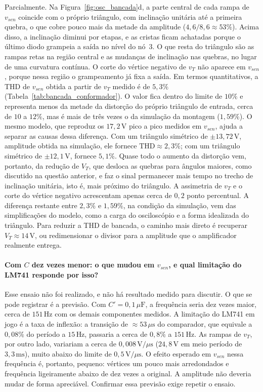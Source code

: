 \documentclass[11pt,a4paper]{article}
\begin{document}
Parcialmente. Na Figura~\ref{fig:osc_bancada}d, a parte central de cada rampa de $v_{sen}$ coincide com o próprio triângulo, com inclinação unitária até a primeira quebra, o que cobre pouco mais da metade da amplitude ($4{,}6/8{,}6 \approx 53\%$). Acima disso, a inclinação diminui por etapas, e as cristas ficam achatadas porque o último diodo grampeia a saída no nível do nó~3. O que resta do triângulo são as rampas retas na região central e as mudanças de inclinação nas quebras, no lugar de uma curvatura contínua. O corte do vértice negativo de $v_T$ não aparece em $v_{sen}$, porque nessa região o grampeamento já fixa a saída. Em termos quantitativos, a THD de $v_{sen}$ obtida a partir de $v_T$ medido é de $5{,}3\%$ (Tabela~\ref{tab:bancada_conformador}). O valor fica dentro do limite de $10\%$ e representa menos da metade da distorção do próprio triângulo de entrada, cerca de $10$ a $12\%$, mas é mais de três vezes o da simulação da montagem ($1{,}59\%$). O mesmo modelo, que reproduz os $17{,}2\,\text{V}$ pico a pico medidos em $v_{sen}$, ajuda a separar as causas dessa diferença. Com um triângulo simétrico de $\pm13{,}72\,\text{V}$, amplitude obtida na simulação, ele fornece $\text{THD} \approx 2{,}3\%$; com um triângulo simétrico de $\pm12{,}1\,\text{V}$, fornece $5{,}1\%$. Quase todo o aumento da distorção vem, portanto, da redução de $V_T$, que desloca as quebras para ângulos maiores, como discutido na questão anterior, e faz o sinal permanecer mais tempo no trecho de inclinação unitária, isto é, mais próximo do triângulo. A assimetria de $v_T$ e o corte do vértice negativo acrescentam apenas cerca de $0{,}2$ ponto percentual. A diferença restante entre $2{,}3\%$ e $1{,}59\%$, na condição da simulação, vem das simplificações do modelo, como a carga do osciloscópio e a forma idealizada do triângulo. Para reduzir a THD de bancada, o caminho mais direto é recuperar $V_T \approx 14\,\text{V}$, ou redimensionar o divisor para a amplitude que o amplificador realmente entrega.

\paragraph{Com $C$ dez vezes menor: o que mudou em $v_{sen}$, e qual limitação do LM741 responde por isso?}

Esse ensaio não foi realizado, e não há resultado medido para discutir. O que se pode registrar é a previsão. Com $C' = 0{,}1\,\mu\text{F}$, a frequência seria dez vezes maior, cerca de $151\,\text{Hz}$ com os demais componentes medidos. A limitação do LM741 em jogo é a taxa de inflexão: a transição de $\approx 53\,\mu\text{s}$ do comparador, que equivale a $0{,}08\%$ do período a $15\,\text{Hz}$, passaria a cerca de $0{,}8\%$ a $151\,\text{Hz}$. As rampas de $v_T$, por outro lado, variariam a cerca de $0{,}008\,\text{V}/\mu\text{s}$ ($24{,}8\,\text{V}$ em meio período de $3{,}3\,\text{ms}$), muito abaixo do limite de $0{,}5\,\text{V}/\mu\text{s}$. O efeito esperado em $v_{sen}$ nessa frequência é, portanto, pequeno: vértices um pouco mais arredondados e frequência ligeiramente abaixo de dez vezes a original. A amplitude não deveria mudar de forma apreciável. Confirmar essa previsão exige repetir o ensaio.
\end{document}
